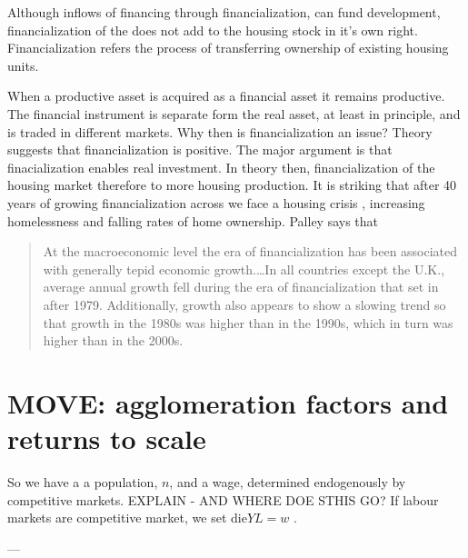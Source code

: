 Although inflows of financing through financialization, can fund development, financialization of the does not add to the housing stock in it's own right. Financialization refers the process of transferring ownership of existing housing units. 

When  a productive asset is acquired as a financial asset it remains productive.  The financial instrument is separate form the real asset, at least in principle, and is traded in different markets. Why then is financialization an issue?  Theory suggests that financialization is positive.  The major argument is that finacialization enables real investment. In theory then, financialization of the housing market therefore  to more housing production. It is striking that after 40 years of growing financialization across we face a housing crisis , increasing homelessness and falling rates of home ownership.  Palley \cite{palleyFinancializationWhatIt2007} says that 

\begin{quotation}At the macroeconomic level the era of financialization has been associated with generally tepid economic growth.\dots  In all countries except the U.K., average annual growth fell during the era of financialization that set in after 1979. Additionally, growth also appears to show a slowing trend so that growth in the 1980s was higher than in the 1990s, which in turn was higher than in the 2000s. \end{quotation}


\section{MOVE: agglomeration factors and returns to scale}

So we have a a population, $n$, and a wage, determined endogenously by competitive markets. 
EXPLAIN - AND WHERE DOE STHIS GO?
If labour markets are \gls{competitive market}, we set die${Y}{L}=w$ .

---

